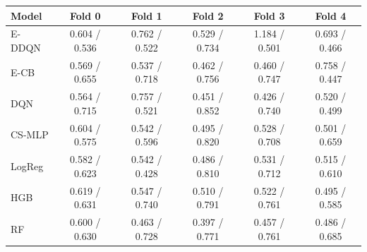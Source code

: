 \begin{tabular}{lccccc}
\toprule
Model & Fold 0 & Fold 1 & Fold 2 & Fold 3 & Fold 4 \\
\midrule
E-DDQN & 0.604 / 0.536 & 0.762 / 0.522 & 0.529 / 0.734 & 1.184 / 0.501 & 0.693 / 0.466 \\
E-CB & 0.569 / 0.655 & 0.537 / 0.718 & 0.462 / 0.756 & 0.460 / 0.747 & 0.758 / 0.447 \\
DQN & 0.564 / 0.715 & 0.757 / 0.521 & 0.451 / 0.852 & 0.426 / 0.740 & 0.520 / 0.499 \\
CS-MLP & 0.604 / 0.575 & 0.542 / 0.596 & 0.495 / 0.820 & 0.528 / 0.708 & 0.501 / 0.659 \\
LogReg & 0.582 / 0.623 & 0.542 / 0.428 & 0.486 / 0.810 & 0.531 / 0.712 & 0.515 / 0.610 \\
HGB & 0.619 / 0.631 & 0.547 / 0.740 & 0.510 / 0.791 & 0.522 / 0.761 & 0.495 / 0.585 \\
RF & 0.600 / 0.630 & 0.463 / 0.728 & 0.397 / 0.771 & 0.457 / 0.761 & 0.486 / 0.685 \\
\bottomrule
\end{tabular}
